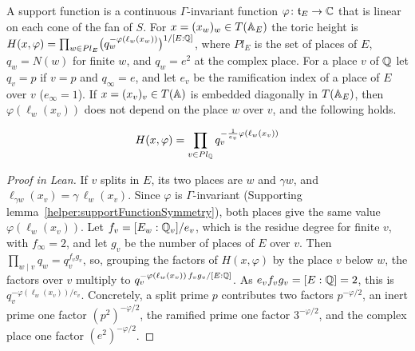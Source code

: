 \begin{equationnode}

\label{eqn:heightforrationaladeles}


\leanok

A support function is a continuous $\Gamma$-invariant function $\varphi\colon\mathfrak t_E\to\CC$ that is linear on each cone of the fan of $S$. For $x=(x_w)_w\in T(\AA_E)$ the toric height is $H(x,\varphi)=\prod_{w\in Pl_E}\bigl(q_w^{-\varphi(\ell_w(x_w))}\bigr)^{1/[E:\QQ]}$, where $Pl_E$ is the set of places of $E$, $q_w=N(w)$ for finite $w$, and $q_w=e^2$ at the complex place. For a place $v$ of $\QQ$ let $q_v=p$ if $v=p$ and $q_\infty=e$, and let $e_v$ be the ramification index of a place of $E$ over $v$ ($e_\infty=1$). If $x=(x_v)_v\in T(\AA)$ is embedded diagonally in $T(\AA_E)$, then $\varphi(\ell_w(x_v))$ does not depend on the place $w$ over $v$, and the following holds.

\begin{equation*} H(x,\varphi) = \prod_{v \in Pl_\QQ} q_v^{-\frac{1}{e_v}\varphi(\ell_w(x_v)) } \end{equation*}

\end{equationnode}

\begin{proof}[Proof in Lean]

\leanok


If $v$ splits in $E$, its two places are $w$ and $\gamma w$, and $\ell_{\gamma w}(x_v)=\gamma\,\ell_w(x_v)$. Since $\varphi$ is $\Gamma$-invariant (Supporting lemma~\ref{helper:supportFunctionSymmetry}), both places give the same value $\varphi(\ell_w(x_v))$. Let $f_v=[E_w:\QQ_v]/e_v$, which is the residue degree for finite $v$, with $f_\infty=2$, and let $g_v$ be the number of places of $E$ over $v$. Then $\prod_{w\mid v}q_w=q_v^{f_vg_v}$, so, grouping the factors of $H(x,\varphi)$ by the place $v$ below $w$, the factors over $v$ multiply to $q_v^{-\varphi(\ell_w(x_v))\,f_vg_v/[E:\QQ]}$. As $e_vf_vg_v=[E:\QQ]=2$, this is $q_v^{-\varphi(\ell_w(x_v))/e_v}$. Concretely, a split prime $p$ contributes two factors $p^{-\varphi/2}$, an inert prime one factor $(p^2)^{-\varphi/2}$, the ramified prime one factor $3^{-\varphi/2}$, and the complex place one factor $(e^2)^{-\varphi/2}$.

\end{proof}

